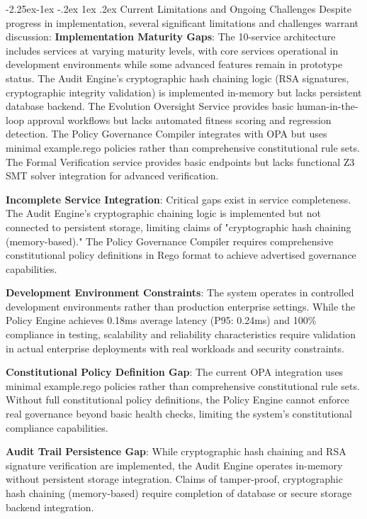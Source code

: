 \documentclass[manuscript,screen,9pt]{acmart}
\makeatletter
\renewcommand\subsection{\@startsection{subsection}{2}{\z@}%
  {-2.25ex\@plus -1ex \@minus -.2ex}%
  {1ex \@plus .2ex}%
  {\normalfont\large\bfseries}}
\makeatother
\begin{document}
\subsection{Current Limitations and Ongoing Challenges}
\label{subsec:challenges_limitations_merged}
Despite progress in implementation, several significant limitations and challenges warrant discussion:
\noindent\textbf{Implementation Maturity Gaps}: The 10-service architecture includes services at varying maturity levels, with core services operational in development environments while some advanced features remain in prototype status. The Audit Engine's cryptographic hash chaining logic (RSA signatures, cryptographic integrity validation) is implemented in-memory but lacks persistent database backend. The Evolution Oversight Service provides basic human-in-the-loop approval workflows but lacks automated fitness scoring and regression detection. The Policy Governance Compiler integrates with OPA but uses minimal example.rego policies rather than comprehensive constitutional rule sets. The Formal Verification service provides basic endpoints but lacks functional Z3 SMT solver integration for advanced verification.

\noindent\textbf{Incomplete Service Integration}: Critical gaps exist in service completeness. The Audit Engine's cryptographic chaining logic is implemented but not connected to persistent storage, limiting claims of "cryptographic hash chaining (memory-based)." The Policy Governance Compiler requires comprehensive constitutional policy definitions in Rego format to achieve advertised governance capabilities.

\noindent\textbf{Development Environment Constraints}: The system operates in controlled development environments rather than production enterprise settings. While the Policy Engine achieves 0.18ms average latency (P95: 0.24ms) and 100\% compliance in testing, scalability and reliability characteristics require validation in actual enterprise deployments with real workloads and security constraints.

\noindent\textbf{Constitutional Policy Definition Gap}: The current OPA integration uses minimal example.rego policies rather than comprehensive constitutional rule sets. Without full constitutional policy definitions, the Policy Engine cannot enforce real governance beyond basic health checks, limiting the system's constitutional compliance capabilities.

\noindent\textbf{Audit Trail Persistence Gap}: While cryptographic hash chaining and RSA signature verification are implemented, the Audit Engine operates in-memory without persistent storage integration. Claims of tamper-proof, cryptographic hash chaining (memory-based) require completion of database or secure storage backend integration.
\end{document}
